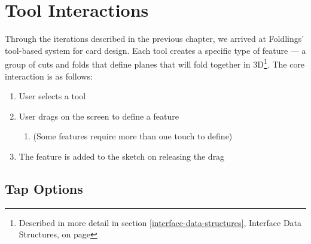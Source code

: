 \section{Tool Interactions}\label{tool-interactions}

Through the iterations described in the previous chapter, we arrived at
Foldlings' tool-based system for card design. Each tool creates a
specific type of feature --- a group of cuts and folds that define
planes that will fold together in 3D\footnote{Described in more detail
  in section \ref{interface-data-structures}, Interface Data Structures,
  on page \pageref{interface-data-structures}}. The core interaction is
as follows:

\begin{enumerate}
\def\labelenumi{\arabic{enumi}.}
\itemsep1pt\parskip0pt
\item
  User selects a tool
\item
  User drags on the screen to define a feature

  \begin{enumerate}
  \def\labelenumii{\alph{enumii}.}
  \itemsep1pt\parskip0pt
  \item
    (Some features require more than one touch to define)
  \end{enumerate}
\item
  The feature is added to the sketch on releasing the drag
\end{enumerate}

\subsection{Tap Options}\label{tap-options}

